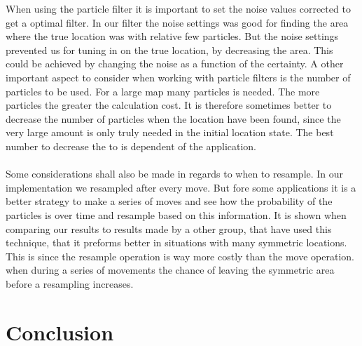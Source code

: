When using the particle filter it is important to set the noise values corrected to get a optimal filter. In our filter the noise settings was good for finding the area where the true location was with relative few particles. But the noise settings prevented us for tuning in on the true location, by decreasing the area. This could be achieved by changing the noise as a function of the certainty.   
A other important aspect to consider when working with particle filters is the number of particles to be used. For a large map many particles is needed. The more particles the greater the calculation cost. It is therefore sometimes better to decrease the number of particles when the location have been found, since the very large amount is only truly needed in the initial location state. The best number to decrease the to is dependent of the application. \\\\
Some considerations shall also be made in regards to when to resample. In our implementation we resampled after every move. But fore some applications it is a better strategy to make a series of moves and see how the probability of the particles is over time and resample based on this information. It is shown when comparing our results to results made by a other group, that have used this technique, that it preforms better in situations with many symmetric locations. This is since the resample operation is way more costly than the move operation. when during a series of movements the chance of leaving the symmetric area before a resampling increases. 


\chapter{Conclusion}
